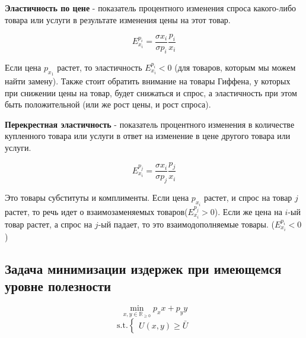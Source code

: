 \documentclass[reqno]{article}
\theoremstyle{definition}
\theoremstyle{definition}
\theoremstyle{definition}
\theoremstyle{definition}
\theoremstyle{definition}
\theoremstyle{definition}
\theoremstyle{definition}
\theoremstyle{definition}
\theoremstyle{definition}
\begin{document}
	\textbf{Эластичность по цене} -  показатель процентного изменения спроса какого-либо товара или услуги в результате изменения цены на этот товар.
	
	$$E_{x_i}^{p_i} = \dfrac{\sigma x_i}{\sigma p_i} \dfrac{p_i}{x_i}$$
	
	Если цена $p_{x_1}$ растет, то эластичность $E_{x_i}^{p_i} < 0$ (для товаров, которым мы можем найти замену). Также стоит обратить внимание на товары Гиффена, у которых при снижении цены на товар, будет снижаться и спрос, а эластичность при этом быть положительной (или же рост цены,  и рост спроса).
	\newpage
	
	\textbf{Перекрестная эластичность} -  показатель процентного изменения в количестве купленного товара или услуги в ответ на изменение в цене другого товара или услуги.
	
	$$E_{x_i}^{p_j} = \dfrac{\sigma x_i}{\sigma p_j} \dfrac{p_j}{x_i}$$
	
	Это товары субституты и комплименты. Если цена $p_{x_i}$ растет, и спрос на товар $j$ растет, то речь идет о взаимозаменяемых товаров($E_{x_i}^{p_j} > 0$). Если же цена на $i$-ый товар растет, а спрос на $j$-ый падает, то это взаимодополняемые товары. ($E_{x_i}^{p_i} < 0$)
	
	\subsection{Задача минимизации издержек при имеющемся уровне полезности}
	
	$$\min_{x,y \in\mathds{R}_{\geq 0}} p_x x + p_y y $$
	$$
	\text{s.t.}
	\begin{cases}
		U(x,y) \geq \bar{U}
	\end{cases}
	$$
	
	\bigskip
	
\end{document}
